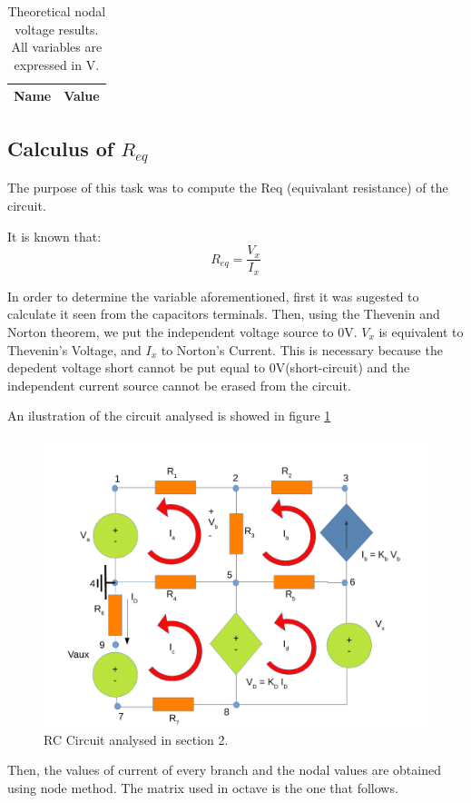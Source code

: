 \begin{table}[ht]
  \centering
  \begin{tabular}{|l|r|}
    \hline    
    {\bf Name} & {\bf Value} \\ \hline
    
  \end{tabular}
  \caption{Theoretical nodal voltage results. All variables are expressed in V.}
  \label{tab:p2}
\end{table}


\subsection{Calculus of $R_{eq}$}
\label{subsection:2.2}

\par The purpose of this task was to compute the Req (equivalant resistance) of the circuit.

It is known that:
\begin{equation}
R_{eq}=\frac{V_{x}}{I_{x}}
\end{equation}

In order to determine the variable aforementioned, first it was sugested to calculate it seen from the capacitors terminals. Then, using the Thevenin and Norton theorem, we put the independent voltage source to 0V. $V_{x}$ is equivalent to Thevenin's Voltage, and $I_{x}$ to Norton's Current. This is necessary because the depedent voltage short cannot be put equal to 0V(short-circuit) and the independent current source cannot be erased from the circuit.
\par An ilustration of the circuit analysed is showed in figure \ref{sim2draw} 
\begin{figure}[h] \centering
\includegraphics[width=0.65\linewidth]{sim2draw.pdf}
\caption{RC Circuit analysed in section 2.}
\label{sim2draw}
\end{figure}
\par
Then, the values of current of  every branch and the nodal values are obtained using node method. The matrix used in octave is the one that follows.

